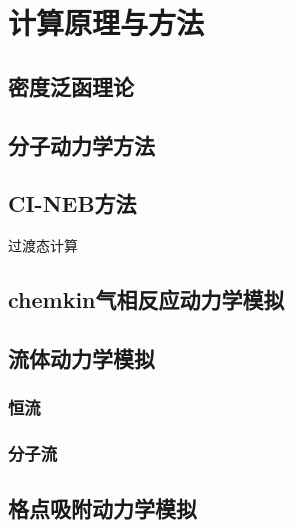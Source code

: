 \chapter{计算原理与方法}
\section{密度泛函理论}
\section{分子动力学方法}
\section{CI-NEB方法}
    过渡态计算
\section{chemkin气相反应动力学模拟}
\section{流体动力学模拟}
    \subsection{恒流}
    \subsection{分子流}
\section{格点吸附动力学模拟}
